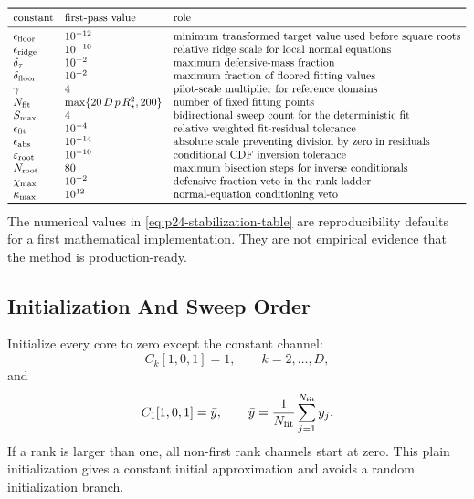 \documentclass[11pt]{article}
\begin{document}
\[
\begin{array}{lll}
\toprule
\text{constant} & \text{first-pass value} & \text{role}\\
\midrule
\epsilon_{\rm floor} & 10^{-12} &
    \text{minimum transformed target value used before square roots}\\
\epsilon_{\rm ridge} & 10^{-10} &
    \text{relative ridge scale for local normal equations}\\
\delta_\tau & 10^{-2} &
    \text{maximum defensive-mass fraction}\\
\delta_{\rm floor} & 10^{-2} &
    \text{maximum fraction of floored fitting values}\\
\gamma & 4 &
    \text{pilot-scale multiplier for reference domains}\\
N_{\rm fit} & \max\{20\,D\,p\,R_\star^2,200\} &
    \text{number of fixed fitting points}\\
S_{\max} & 4 &
    \text{bidirectional sweep count for the deterministic fit}\\
\epsilon_{\rm fit} & 10^{-4} &
    \text{relative weighted fit-residual tolerance}\\
\epsilon_{\rm abs} & 10^{-14} &
    \text{absolute scale preventing division by zero in residuals}\\
\varepsilon_{\rm root} & 10^{-10} &
    \text{conditional CDF inversion tolerance}\\
N_{\rm root} & 80 &
    \text{maximum bisection steps for inverse conditionals}\\
\chi_{\max} & 10^{-2} &
    \text{defensive-fraction veto in the rank ladder}\\
\kappa_{\max} & 10^{12} &
    \text{normal-equation conditioning veto}\\
\bottomrule
\end{array}
\label{eq:p24-stabilization-table}
\]
The numerical values in \eqref{eq:p24-stabilization-table} are reproducibility
defaults for a first mathematical implementation.  They are not empirical
evidence that the method is production-ready.

\subsection{Initialization And Sweep Order}

Initialize every core to zero except the constant channel:
\[
    C_k[1,0,1]=1,\qquad k=2,\ldots,D,
\]
and
\[
    C_1[1,0,1]=\bar y,\qquad
    \bar y=\frac1{N_{\rm fit}}\sum_{j=1}^{N_{\rm fit}}y_j.
\]
If a rank is larger than one, all non-first rank channels start at zero.  This
plain initialization gives a constant initial approximation and avoids a random
initialization branch.
\end{document}
